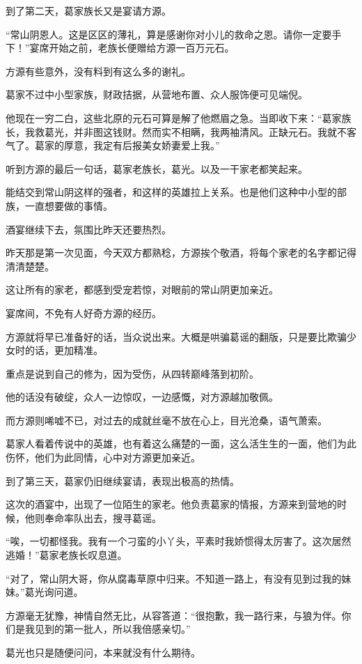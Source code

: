 \begin{this_body}
到了第二天，葛家族长又是宴请方源。

“常山阴恩人。这是区区的薄礼，算是感谢你对小儿的救命之恩。请你一定要手下！”宴席开始之前，老族长便赠给方源一百万元石。

方源有些意外，没有料到有这么多的谢礼。

葛家不过中小型家族，财政拮据，从营地布置、众人服饰便可见端倪。

他现在一穷二白，这些北原的元石可算是解了他燃眉之急。当即收下来：“葛家族长，我救葛光，并非图这钱财。然而实不相瞒，我两袖清风。正缺元石。我就不客气了。葛家的厚意，我定有后报美女娇妻爱上我。”

听到方源的最后一句话，葛家老族长，葛光。以及一干家老都笑起来。

能结交到常山阴这样的强者，和这样的英雄拉上关系。也是他们这种中小型的部族，一直想要做的事情。

酒宴继续下去，氛围比昨天还要热烈。

昨天那是第一次见面，今天双方都熟稔，方源挨个敬酒，将每个家老的名字都记得清清楚楚。

这让所有的家老，都感到受宠若惊，对眼前的常山阴更加亲近。

宴席间，不免有人好奇方源的经历。

方源就将早已准备好的话，当众说出来。大概是哄骗葛谣的翻版，只是要比欺骗少女时的话，更加精准。

重点是说到自己的修为，因为受伤，从四转巅峰落到初阶。

他的话没有破绽，众人一边惊叹，一边感慨，对方源越加敬佩。

而方源则唏嘘不已，对过去的成就丝毫不放在心上，目光沧桑，语气萧索。

葛家人看着传说中的英雄，也有着这么痛楚的一面，这么活生生的一面，他们为此伤怀，他们为此同情，心中对方源更加亲近。

到了第三天，葛家仍旧继续宴请，表现出极高的热情。

这次的酒宴中，出现了一位陌生的家老。他负责葛家的情报，方源来到营地的时候，他则奉命率队出去，搜寻葛谣。

“唉，一切都怪我。我有一个刁蛮的小丫头，平素时我娇惯得太厉害了。这次居然逃婚！”葛家老族长叹息道。

“对了，常山阴大哥，你从腐毒草原中归来。不知道一路上，有没有见到过我的妹妹。”葛光询问道。

方源毫无犹豫，神情自然无比，从容答道：“很抱歉，我一路行来，与狼为伴。你们是我见到的第一批人，所以我倍感亲切。”

葛光也只是随便问问，本来就没有什么期待。


\end{this_body}
